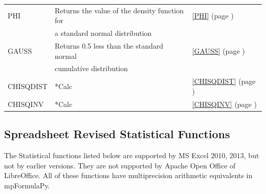 \begin{center}
\begin{longtable}{l l l }
		PHI & Returns the value of the density function for  &  \ref{PHI} (page \pageref{PHI}) \index{Spreadsheet Functions!PHI} \\
		& a standard normal distribution &   \\			
		GAUSS & Returns 0.5 less than the standard normal  &  \ref{GAUSS} (page \pageref{GAUSS}) \index{Spreadsheet Functions!GAUSS} \\
		& cumulative distribution &   \\	
		CHISQDIST & *Calc &  \ref{CHISQDIST} (page \pageref{CHISQDIST}) \index{Spreadsheet Functions!CHISQDIST} \\
		CHISQINV & *Calc &  \ref{CHISQINV} (page \pageref{CHISQINV}) \index{Spreadsheet Functions!CHISQINV} \\
	\end{longtable}
\end{center}






\newpage 
\subsection{Spreadsheet Revised Statistical Functions}
The Statistical functions listed below are supported by MS Excel 2010, 2013, but not by earlier versions. They are not supported by Apache Open Office of LibreOffice.
All of these functions have multiprecision arithmetic equivalents in mpFormulaPy.




